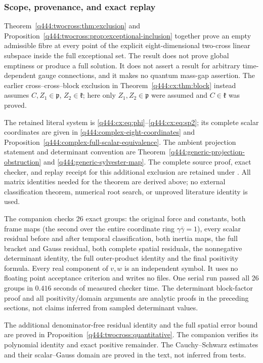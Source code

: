 \subsubsection{Scope, provenance, and exact replay}
\label{q444:twocross:scope-replay}

Theorem~\ref{q444:twocross:thm:exclusion} and Proposition~\ref{q444:twocross:prop:exceptional-inclusion}
together prove an empty admissible fibre at every point of the explicit
eight-dimensional two-cross linear subspace inside the full exceptional set.
The result does not prove global emptiness or produce a full solution.
It does not assert a result for arbitrary time-dependent gauge connections,
and it makes no quantum mass-gap assertion. The earlier cross--cross--block exclusion in
Theorem~\ref{q444:cx:thm:block} instead assumes $C,Z_1\in\mathfrak p$, $Z_2\in\mathfrak k$;
here only $Z_1,Z_2\in\mathfrak p$ were assumed and $C\in\mathfrak k$ was proved.

The retained literal system is
\eqref{q444:cx:eq:phi}--\eqref{q444:cx:eq:sp2}; its complete scalar
coordinates are given in \eqref{q444:complex-eight-coordinates} and
Proposition~\ref{q444:complex-full-scalar-equivalence}.
The ambient projection statement and determinant convention are
Theorem~\ref{q444:generic-projection-obstruction} and
\eqref{q444:generic-sylvester-map}. The complete source proof, exact
checker, and replay receipt for this additional exclusion are retained
under .
All matrix identities needed for the theorem are derived above; no
external classification theorem, numerical root search, or unproved
literature identity is used.

The companion  checks 26 exact groups:
the original force and constants, both frame maps (the second over the
entire coordinate ring $\gamma\bar\gamma=1$), every scalar residual before
and after temporal classification, both inertia maps, the full bracket and
Gauss residual, both complete spatial residuals, the nonnegative determinant
identity, the full outer-product identity and the final positivity formula.
Every real component of $v,w$ is an independent symbol. It uses no floating
point acceptance criterion and writes no files. One serial run passed all
26 groups in $0.416$ seconds of measured checker time.
The determinant block-factor proof and all positivity/domain arguments
are analytic proofs in the preceding sections, not claims inferred from
sampled determinant values.

The additional denominator-free residual identity and the full spatial
error bound are proved in Proposition~\ref{q444:twocross:quantitative}.
The companion  verifies its polynomial
identity and exact positive remainder. The Cauchy--Schwarz estimates and
their scalar--Gauss domain are proved in the text, not inferred from tests.
